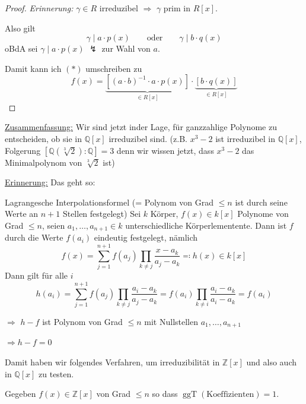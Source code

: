 \documentclass[12pt,parskip=full]{scrartcl}
\newcommand{\setZ}{\mathbb{Z}}
\newcommand{\setQ}{\mathbb{Q}}
\newcommand{\heading}{\underline}
\theoremstyle{definition}
\theoremstyle{remark}
\begin{document}
\begin{proof}
		\textit{Erinnerung:} $\gamma \in R$ irreduzibel $\Rightarrow$ $\gamma$ prim in $R[x]$.
		
		Also gilt
		\begin{equation*}
			\gamma \mid a \cdot p(x) \qquad\text{oder}\qquad \gamma \mid b \cdot q(x)
		\end{equation*}
		oBdA sei $\gamma \mid a \cdot p(x)$ $\lightning$ zur Wahl von $a$.
		
		Damit kann ich $(*)$ umschreiben zu
		\begin{equation*}
			f(x) = \underbrace{\left[ (a \cdot b)^{-1} \cdot a \cdot p(x) \right]}_{\in R[x]} \cdot \underbrace{\left[ b \cdot q(x) \right]}_{\in R[x]}
		\end{equation*}
	\end{proof}

	\heading{Zusammenfassung:} Wir sind jetzt inder Lage, für ganzzahlige Polynome zu entscheiden, ob sie in $\setQ[x]$ irreduzibel sind. (z.B. $x^3 - 2$ ist irreduzibel in $\setQ[x]$, Folgerung $[\setQ(\sqrt[3]{2}): \setQ] = 3$ denn wir wissen jetzt, dass $x^3 - 2$ das Minimalpolynom von $\sqrt[3]{2}$ ist)
	
	\heading{Erinnerung:} Das geht so:
	
	Lagrangesche Interpolationsformel (= Polynom von Grad $\leq n$ ist durch seine Werte an $n+1$ Stellen festgelegt) Sei $k$ Körper, $f(x) \in k[x]$ Polynome von Grad $\leq n$, seien $a_1, \dots, a_{n+1} \in k$ unterschiedliche Körperlementente. Dann ist $f$ durch die Werte $f(a_i)$ eindeutig festgelegt, nämlich
	\begin{equation*}
		f(x) = \sum_{j=1}^{n+1} f(a_j) \prod_{k \neq j} \frac{x - a_k}{a_j - a_k} \eqqcolon h(x) \in k[x]
	\end{equation*}
	Dann gilt für alle $i$
	\begin{equation*}
		h(a_i) = \sum_{j = 1}^{n+1} f(a_j) \prod_{k \neq j} \frac{a_i - a_k}{a_j - a_k} = f(a_i) \prod_{k \neq i} \frac{a_i - a_k}{a_i - a_k} = f(a_i)
	\end{equation*}
	
	$\Rightarrow$ $h-f$ ist Polynom von Grad $\leq n$ mit Nullstellen $a_1, \dots, a_{n+1}$
	
	$\Rightarrow h - f = 0$
	
	Damit haben wir folgendes Verfahren, um irreduzibilität in $\setZ[x]$ und also auch in $\setQ[x]$ zu testen.
	
	Gegeben $f(x) \in \setZ[x]$ von Grad $\leq n$ so dass $\operatorname{ggT}(\text{Koeffizienten}) = 1$.
	
\end{document}

